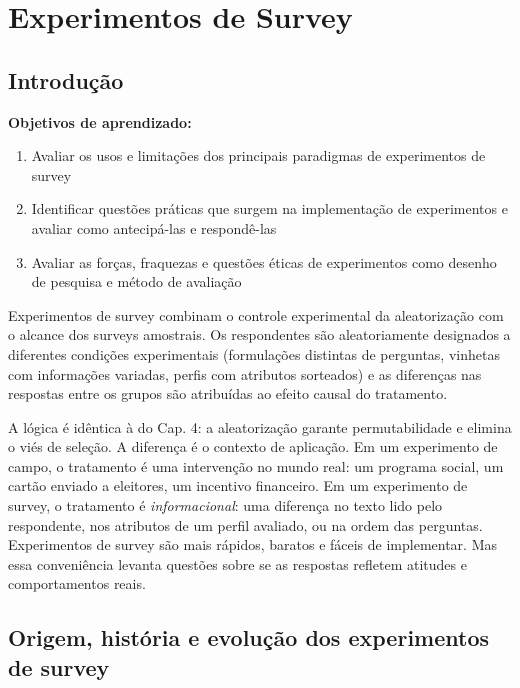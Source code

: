 \documentclass[
]{article}
\providecommand{\tightlist}{%
  \setlength{\itemsep}{0pt}\setlength{\parskip}{0pt}}
\begin{document}
\section{Experimentos de Survey}\label{experimentos-de-survey}

\subsection{Introdução}\label{introduuxe7uxe3o-3}

\textbf{Objetivos de aprendizado:}

\begin{enumerate}
\def\labelenumi{\arabic{enumi}.}
\tightlist
\item
  Avaliar os usos e limitações dos principais paradigmas de experimentos de survey
\item
  Identificar questões práticas que surgem na implementação de experimentos e avaliar como antecipá-las e respondê-las
\item
  Avaliar as forças, fraquezas e questões éticas de experimentos como desenho de pesquisa e método de avaliação
\end{enumerate}

Experimentos de survey combinam o controle experimental da aleatorização com o alcance dos surveys amostrais. Os respondentes são aleatoriamente designados a diferentes condições experimentais (formulações distintas de perguntas, vinhetas com informações variadas, perfis com atributos sorteados) e as diferenças nas respostas entre os grupos são atribuídas ao efeito causal do tratamento.

A lógica é idêntica à do Cap. 4: a aleatorização garante permutabilidade e elimina o viés de seleção. A diferença é o contexto de aplicação. Em um experimento de campo, o tratamento é uma intervenção no mundo real: um programa social, um cartão enviado a eleitores, um incentivo financeiro. Em um experimento de survey, o tratamento é \emph{informacional}: uma diferença no texto lido pelo respondente, nos atributos de um perfil avaliado, ou na ordem das perguntas. Experimentos de survey são mais rápidos, baratos e fáceis de implementar. Mas essa conveniência levanta questões sobre se as respostas refletem atitudes e comportamentos reais.

\subsection{Origem, história e evolução dos experimentos de survey}\label{origem-histuxf3ria-e-evoluuxe7uxe3o-dos-experimentos-de-survey}
\end{document}
